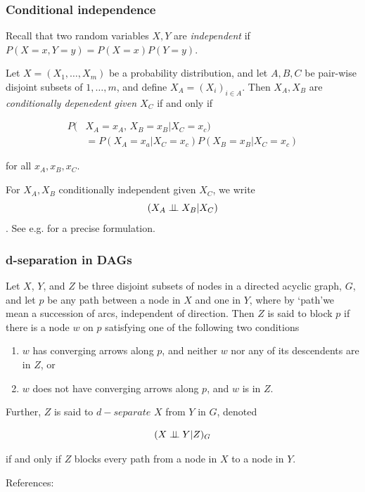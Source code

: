 \begin{frame}
\frametitle{Conditional independence}

Recall that two random variables $X, Y$ are \emph{independent} if $P(X=x, Y=y) = P(X=x) P(Y=y)$.

\begin{definition}
Let $X = (X_1, \ldots, X_m)$ be a probability distribution, and let $A, B, C$ be pair-wise disjoint subsets of ${1, \ldots, m}$, and define $X_A = (X_i)_{i \in A}$. Then $X_A, X_B$ are \emph{conditionally depenedent given $X_C$} if and only if 

\begin{align*}
P(&X_A = x_A,  \,X_B = x_B | X_C = x_c) \\
&= P(X_A = x_a | X_C = x_c) P(X_B = x_B | X_C = x_c)
\end{align*}

for all $x_A, x_B, x_C$.\newline
\end{definition}

For $X_A, X_B$ conditionally independent given $X_C$, we write $$(X_A \perp\!\!\!\perp X_B | X_C)$$. See e.g. \cite{drton2008lectures} for a precise formulation.
\end{frame}


\begin{frame}
\frametitle{d-separation in DAGs}
\begin{definition}
Let $X$, $Y$, and $Z$ be three disjoint subsets of nodes in a directed acyclic graph, $G$, and let $p$ be any path between a node in $X$ and one in $Y$, where by `path'we mean a succession of arcs, independent of direction. Then $Z$ is said to block $p$ if there is a node $w$ on $p$ satisfying one of the following two conditions

\begin{enumerate}
\item $w$ has converging arrows along $p$, and neither $w$ nor any of its descendents are in $Z$, or
\item $w$ does not have converging arrows along $p$, and $w$ is in $Z$.
\end{enumerate}

Further, $Z$ is said to $d-separate$ $X$ from $Y$ in $G$, denoted 

\begin{equation*}
    (X \perp\!\!\!\perp Y | Z)_G
\end{equation*}

if and only if $Z$ blocks every path from a node in $X$ to a node in $Y$.\newline
\end{definition}
References: \cite{pearl1995causal}
\end{frame}


